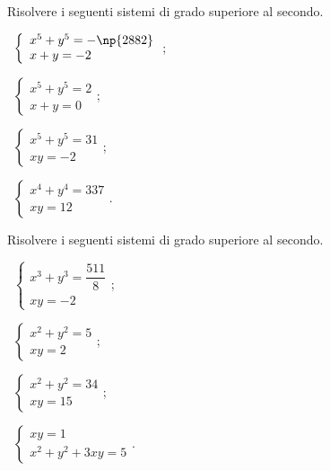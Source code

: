 \begin{esercizio}[\Ast]
 \label{ese:6.40}
Risolvere i seguenti sistemi di grado superiore al secondo.
\begin{multicols}{2}
 \begin{enumeratea}
 \item~$\left\{\begin{array}{l}x^5+y^5=-\np{2882}\\x+y=-2\end{array}\right.$;
 \item~$\left\{\begin{array}{l}x^5+y^5=2\\x+y=0\end{array}\right.$;
 \item~$\left\{\begin{array}{l}x^5+y^5=31\\xy=-2\end{array}\right.$;
 \item~$\left\{\begin{array}{l}x^4+y^4=337\\xy=12\end{array}\right.$.
 \end{enumeratea}
 \end{multicols}
\end{esercizio}

\begin{esercizio}[\Ast]
 \label{ese:6.41}
Risolvere i seguenti sistemi di grado superiore al secondo.
\begin{multicols}{2}
 \begin{enumeratea}
 \item~$\left\{\begin{array}{l}x^3+y^3=\dfrac{511} 8\\xy=-2\end{array}\right.$;
 \item~$\left\{\begin{array}{l}x^2+y^2=5\\xy=2 \end{array}\right.$;
 \item~$\left\{\begin{array}{l}x^2+y^2=34\\xy=15 \end{array}\right.$;
 \item~$\left\{\begin{array}{l}xy=1 \\x^2+y^2+3xy=5\end{array}\right.$.
 \end{enumeratea}
 \end{multicols}
\end{esercizio}

